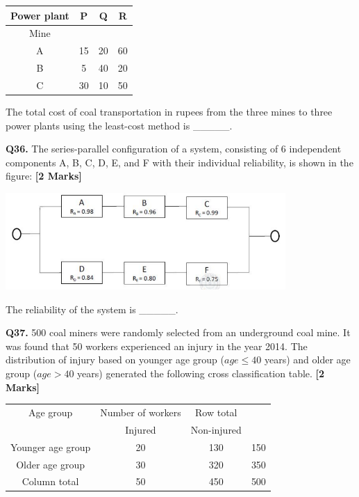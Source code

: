 \documentclass[11pt]{article}
\newcommand{\questionb}[2]{
    \noindent\textbf{Q#2.} #1 \hfill \textbf{[2 Marks]}
}
\begin{document}
\begin{center}
\begin{tabular}{|c|c|c|c|}
\hline
Power plant & P & Q & R \\
\hline
Mine & & & \\
A & 15 & 20 & 60 \\
B & 5 & 40 & 20 \\
C & 30 & 10 & 50 \\
\hline
\end{tabular}
\end{center}

The total cost of coal transportation in rupees from the three mines to three power plants using the least-cost method is \_\_\_\_\_.
\vspace{0.5cm}

\questionb{The series-parallel configuration of a system, consisting of 6 independent components A, B, C, D, E, and F with their individual reliability, is shown in the figure:}{36}

\begin{center}
\includegraphics[width=0.8\textwidth]{figures/36.png}
\end{center}

The reliability of the system is \_\_\_\_\_.
\vspace{0.5cm}

\questionb{500 coal miners were randomly selected from an underground coal mine. It was found that 50 workers experienced an injury in the year 2014. The distribution of injury based on younger age group (\( age \leq 40 \) years) and older age group (\( age > 40 \) years) generated the following cross classification table.}{37}

\begin{center}
\begin{tabular}{|c|c|c|c|}
\hline
Age group & Number of workers & Row total \\
 & Injured & Non-injured & \\
\hline
Younger age group & 20 & 130 & 150 \\
Older age group & 30 & 320 & 350 \\
Column total & 50 & 450 & 500 \\
\hline
\end{tabular}
\end{center}
\end{document}

